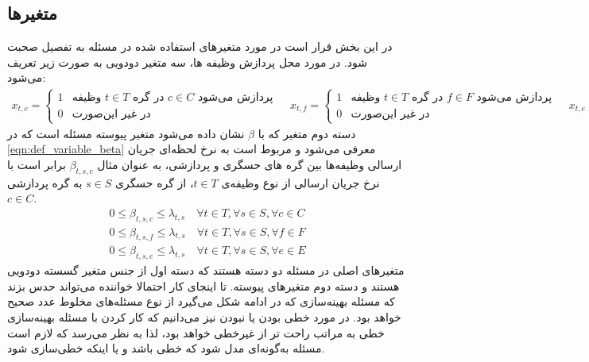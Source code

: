 	\subsection{متغیرها}
	در این بخش قرار است در مورد متغیرهای استفاده شده در مسئله به تفصیل صحبت شود. 
	در مورد محل پردازش وظیفه ها، سه متغیر دودویی به صورت زیر تعریف می‌شود:
	    \begin{subequations}\label{eqn:def_variable_x}
		\begin{align}
			x_{t,c} =
			\begin{cases}
				1 & \text{وظیفه $t \in T$ در گره $c \in C$ پردازش می‌شود } \\
				0 & \text{در غیر این‌صورت}
			\end{cases}
		\end{align}
		\begin{align}
			x_{t,f} =
			\begin{cases}
				1 & \text{وظیفه $t \in T$ در گره $f \in F$ پردازش می‌شود } \\
				0 & \text{در غیر این‌صورت}
			\end{cases}
		\end{align}
		\begin{align}
			x_{t,e} =
			\begin{cases}
				1 & \text{وظیفه $t \in T$ در گره $e \in E$ پردازش می‌شود } \\
				0 & \text{در غیر این‌صورت}
			\end{cases}
		\end{align}
	\end{subequations}
	دسته دوم متغیر که با $\beta$ نشان داده می‌شود متغیر پیوسته مسئله است که در \cref{eqn:def_variable_beta} معرفی می‌شود و مربوط است به نرخ لحظه‌ای جریان ارسالی وظیفه‌ها بین گره های حسگری و پردازشی، به عنوان مثال $\beta_{t,s,c}$ برابر است با نرخ جریان ارسالی از نوع وظیفه‌ی $t \in T$، از گره حسگری $s \in S$ به گره پردازشی $c \in C$.
	\begin{subequations}\label{eqn:def_variable_beta}
		\begin{align}
		0 \le \beta_{t,s,c} \le \lambda_{t,s}  \quad \forall{t \in T}, \forall{s \in S}, \forall{c \in C} \\
		0 \le \beta_{t,s,f} \le \lambda_{t,s}  \quad \forall{t \in T}, \forall{s \in S}, \forall{f \in F} \\
		0 \le \beta_{t,s,e} \le \lambda_{t,s}  \quad \forall{t \in T}, \forall{s \in S}, \forall{e \in E}
		\end{align}
	\end{subequations}
	متغیرهای اصلی در مسئله دو دسته هستند که دسته اول از جنس متغیر گسسته دودویی هستند و دسته دوم متغیرهای پیوسته. تا اینجای کار احتمالا خواننده می‌تواند حدس بزند که مسئله بهینه‌سازی که در ادامه شکل می‌گیرد از نوع مسئله‌های مخلوط عدد صحیح  خواهد بود. در مورد خطی بودن یا نبودن نیز می‌دانیم که کار کردن با مسئله بهینه‌سازی خطی به مراتب راحت تر از غیرخطی خواهد بود، لذا به نظر می‌رسد که لازم است مسئله به‌گونه‌ای مدل شود که خطی باشد و یا اینکه خطی‌سازی شود. 
	
